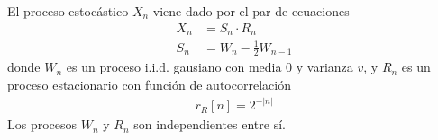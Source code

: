 
\ifspanish

El proceso estocástico $X_n$ viene dado por el par de ecuaciones
\begin{align*}
X_n &= S_n \cdot R_n \\
S_n &= W_n - \frac12 W_{n-1}
\end{align*}
donde $W_n$ es un proceso i.i.d. gausiano con media $0$ y varianza $v$, y $R_n$ es un proceso estacionario con función de autocorrelación
\begin{align*}
r_R[n] = 2^{-|n|}
\end{align*}
Los procesos $W_n$ y $R_n$ son independientes entre sí.

